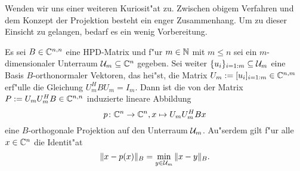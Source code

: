 Wenden wir uns einer weiteren Kuriosit"at zu. Zwischen obigem Verfahren und dem Konzept der Projektion besteht ein enger Zusammenhang.
Um zu dieser Einsicht zu gelangen, bedarf es ein wenig
Vorbereitung.
\begin{thm}\label{thm:projektor}
Es sei $B\in\mathbb{C}^{n,n}$ eine HPD-Matrix und f"ur $m\in\mathbb{N}$ mit $m\le n$ sei
ein $m$-dimensionaler Unterraum $\mathcal{U}_m \subseteq \mathbb{C}^n$ gegeben. Sei weiter $\{u_i\}_{i=1:m}\subseteq\mathcal{U}_m$ eine
Basis $B$-orthonormaler Vektoren, das hei"st, die Matrix $U_m := [u_i]_{i=1:m}
\in\mathbb{C}^{n,m}$ erf"ulle die Gleichung $U_m^H B U_m = I_m$. Dann ist die von der Matrix
 $P := U_m U_m^H B \in \mathbb{C}^{n,n}$ induzierte lineare Abbildung
\[
p \colon \mathbb{C}^n \to \mathbb{C}^n, x\mapsto U_m U_m^H Bx
\]
eine $B$-orthogonale Projektion auf den Unterraum $\mathcal{U}_m$. Au"serdem gilt
f"ur alle $x\in\mathbb{C}^n$ die Identit"at
\[
\|x-p(x)\|_B = \min_{y\in\mathcal{U}_m} \|x - y\|_B.
\]
\end{thm}

